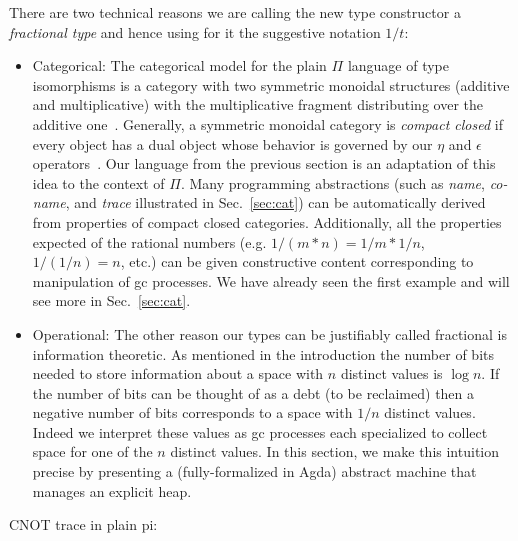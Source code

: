 \documentclass[sigplan,10pt,review,anonymous]{acmart}
\newcommand{\oneover}[1]{1/#1}
\begin{document}
There are two technical reasons we are calling the new type constructor a
\emph{fractional type} and hence using for it the suggestive notation
$\oneover{t}$:
\begin{itemize}
\item Categorical: The categorical model for the plain $\Pi$ language
  of type isomorphisms is a category with two symmetric monoidal
  structures (additive and multiplicative) with the multiplicative
  fragment distributing over the additive one~\cite{XXX}. Generally,
  a symmetric monoidal category is \emph{compact closed} if every
  object has a dual object whose behavior is governed by our $\eta$
  and $\epsilon$ operators~\cite{XXX}. Our language from the previous
  section is an adaptation of this idea to the context of $\Pi$. Many
  programming abstractions (such as \emph{name}, \emph{co-name}, and
  \emph{trace} illustrated in Sec.~\ref{sec:cat}) can be automatically
  derived from properties of compact closed categories. Additionally,
  all the properties expected of the rational numbers
  (e.g. $\oneover{(m*n)} = \oneover{m}*\oneover{n}$,
  $\oneover{(\oneover{n})}=n$, etc.) can be given constructive content
  corresponding to manipulation of gc processes. We have already seen
  the first example and will see more in Sec.~\ref{sec:cat}.

\item Operational: The other reason our types can be justifiably
  called fractional is information theoretic. As mentioned in the
  introduction the number of bits needed to store information about a
  space with $n$ distinct values is $\log{n}$. If the number of bits
  can be thought of as a debt (to be reclaimed) then a negative number
  of bits corresponds to a space with $\oneover{n}$ distinct
  values. Indeed we interpret these values as gc processes each
  specialized to collect space for one of the $n$ distinct values. In
  this section, we make this intuition precise by presenting a
  (fully-formalized in Agda) abstract machine that manages an explicit
  heap. 
\end{itemize}


CNOT trace in plain pi: 
\end{document}
